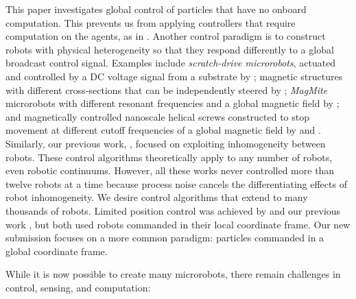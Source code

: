 This paper investigates global control of particles that have no onboard computation. This prevents us from applying controllers that require computation on the agents, as in \cite{milutinovic2006modeling,prorok2011multi,demir2015probabilistic}.
Another control paradigm is to construct robots with physical heterogeneity so that they respond differently to a global broadcast control signal.  Examples include \emph{scratch-drive microrobots}, actuated and controlled by a DC voltage signal from a substrate by \cite{Donald2006,Donald2008};  magnetic structures  with different cross-sections that can be independently steered by \cite{Floyd2011,Diller2013};  \emph{MagMite} microrobots with different resonant frequencies and a global magnetic field by \cite{Frutiger2008}; and  magnetically controlled nanoscale helical screws constructed to stop movement at different cutoff frequencies of a global magnetic field by
\cite{Tottori2012} and \cite{Peyer2013}. 
Similarly, our previous work, \cite{Becker2012,Becker2012k}, focused on exploiting inhomogeneity between robots.  These control algorithms theoretically apply to any number of robots, even robotic continuums.
However, all these works never controlled more than twelve robots at a time because process noise cancels the differentiating effects of robot inhomogeneity.
 We desire control algorithms that extend to many thousands of robots.
Limited position control was achieved by \cite{bretl2007control} and our previous work \cite{beckerIJRR2014}, but both used robots commanded in their local coordinate frame. Our new submission focuses on a more common paradigm: particles commanded in a global coordinate frame.

 While it is now possible to create many microrobots, there remain challenges in control, sensing, and computation:
  
